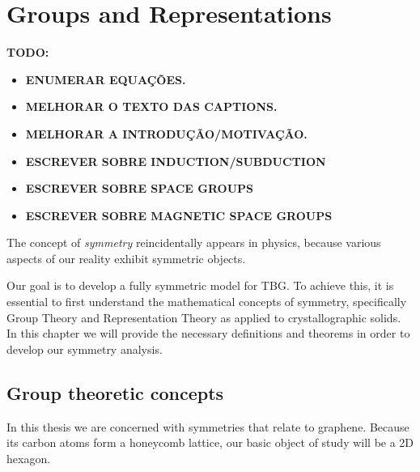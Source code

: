 


\chapter{Groups and Representations}

\textbf{TODO:}
\begin{itemize}
\item \textbf{ENUMERAR EQUAÇÕES.}
\item \textbf{MELHORAR O TEXTO DAS CAPTIONS.}
\item \textbf{MELHORAR A INTRODUÇÃO/MOTIVAÇÃO.}
\item \textbf{ESCREVER SOBRE INDUCTION/SUBDUCTION}
\item \textbf{ESCREVER SOBRE SPACE GROUPS}
\item \textbf{ESCREVER SOBRE MAGNETIC SPACE GROUPS}
\end{itemize}

The concept of \textit{symmetry} reincidentally appears in physics, because various aspects of our reality exhibit symmetric objects.

Our goal is to develop a fully symmetric model for TBG. To achieve this, it is essential to first understand the mathematical concepts of symmetry, specifically Group Theory and Representation Theory as applied to crystallographic solids. In this chapter we will provide the necessary definitions and theorems in order to develop our symmetry analysis.

\section{Group theoretic concepts}

In this thesis we are concerned with symmetries that relate to graphene. Because its carbon atoms form a honeycomb lattice, our basic object of study will be a 2D hexagon.

